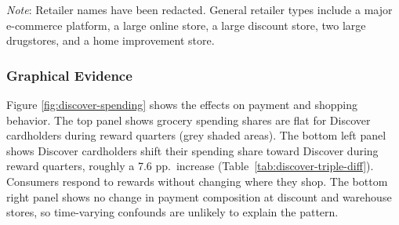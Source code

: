 \documentclass[main.tex]{subfiles}
\begin{document}
\begin{table}
    \vspace{5pt}
    \begin{minipage}{0.85\textwidth}
    \footnotesize
    \textit{Note}: Retailer names have been redacted. General retailer types include a major e-commerce platform, a large online store, a large discount store, two large drugstores, and a home improvement store.
    \end{minipage}
\end{table}

\subsubsection{Graphical Evidence}

Figure \ref{fig:discover-spending} shows the effects on payment and shopping behavior.
The top panel shows grocery spending shares are flat for Discover cardholders during reward quarters (grey shaded areas).
The bottom left panel shows Discover cardholders shift their spending share toward Discover during reward quarters, roughly a 7.6 pp.\ increase (Table~\ref{tab:discover-triple-diff}).
Consumers respond to rewards without changing where they shop.
The bottom right panel shows no change in payment composition at discount and warehouse stores, so time-varying confounds are unlikely to explain the pattern.
\end{document}

